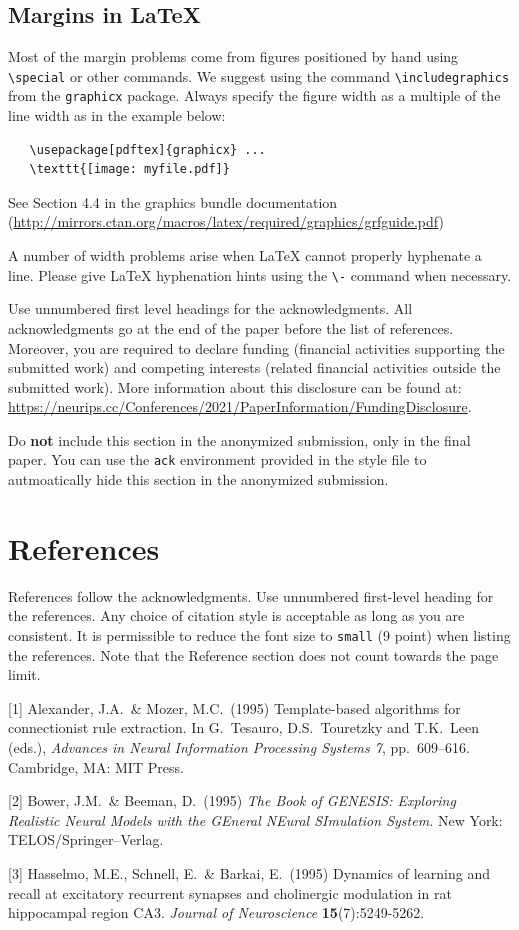 \documentclass{article}
\begin{document}
\subsection{Margins in \LaTeX{}}

Most of the margin problems come from figures positioned by hand using
\verb+\special+ or other commands. We suggest using the command
\verb+\includegraphics+ from the \verb+graphicx+ package. Always specify the
figure width as a multiple of the line width as in the example below:
\begin{verbatim}
   \usepackage[pdftex]{graphicx} ...
   \texttt{[image: myfile.pdf]}
\end{verbatim}
See Section 4.4 in the graphics bundle documentation
(\url{http://mirrors.ctan.org/macros/latex/required/graphics/grfguide.pdf})

A number of width problems arise when \LaTeX{} cannot properly hyphenate a
line. Please give LaTeX hyphenation hints using the \verb+\-+ command when
necessary.

\begin{ack}
Use unnumbered first level headings for the acknowledgments. All acknowledgments
go at the end of the paper before the list of references. Moreover, you are required to declare
funding (financial activities supporting the submitted work) and competing interests (related financial activities outside the submitted work).
More information about this disclosure can be found at: \url{https://neurips.cc/Conferences/2021/PaperInformation/FundingDisclosure}.

Do {\bf not} include this section in the anonymized submission, only in the final paper. You can use the \texttt{ack} environment provided in the style file to autmoatically hide this section in the anonymized submission.
\end{ack}

\section*{References}

References follow the acknowledgments. Use unnumbered first-level heading for
the references. Any choice of citation style is acceptable as long as you are
consistent. It is permissible to reduce the font size to \verb+small+ (9 point)
when listing the references.
Note that the Reference section does not count towards the page limit.
\medskip

{
\small

[1] Alexander, J.A.\ \& Mozer, M.C.\ (1995) Template-based algorithms for
connectionist rule extraction. In G.\ Tesauro, D.S.\ Touretzky and T.K.\ Leen
(eds.), {\it Advances in Neural Information Processing Systems 7},
pp.\ 609--616. Cambridge, MA: MIT Press.

[2] Bower, J.M.\ \& Beeman, D.\ (1995) {\it The Book of GENESIS: Exploring
  Realistic Neural Models with the GEneral NEural SImulation System.}  New York:
TELOS/Springer--Verlag.

[3] Hasselmo, M.E., Schnell, E.\ \& Barkai, E.\ (1995) Dynamics of learning and
recall at excitatory recurrent synapses and cholinergic modulation in rat
hippocampal region CA3. {\it Journal of Neuroscience} {\bf 15}(7):5249-5262.
}
\end{document}
